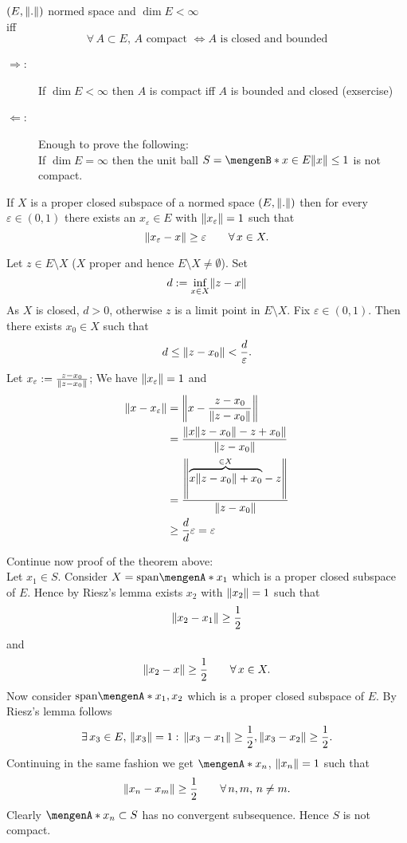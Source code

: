\begin{theorem}
	$(E,\norm{.})$ normed space and $\dim E < \infty$ \\ iff \[
		\forall\, A \subset E,\,A \text{ compact } \Leftrightarrow A \text{ is closed and bounded}
	\]
\end{theorem}
\begin{beweis}
	\begin{description}
		\item[$\Rightarrow$:]If $\dim E < \infty$ then $A$ is compact iff $A$ is bounded and closed (exsercise)
		\item[$\Leftarrow$:]Enough to prove the following: \\
		If $\dim E = \infty$ then the unit ball $S = \set[x \in E]{\norm{x}\leq 1}$ is not compact.
	\end{description}
\begin{lemma}
	If $X$ is a proper closed subspace of a normed space $(E,\norm{.})$ then for every $\varepsilon \in (0,1)$ there exists an $x_{\varepsilon} \in E$ with $\norm{x_\varepsilon}=1$ such that
	\[
		\norm{x_{\varepsilon}-x} \geq \varepsilon \qquad \forall\, x \in X.
	\]
\end{lemma}
\begin{beweis}
	Let $z \in E \setminus X$ ($X$ proper and hence $E \setminus X \neq \emptyset$). Set 
	\[
		d:= \inf_{x \in X}\norm{z-x}
	\] As $X$ is closed, $d >0$, otherwise $z$ is a limit point in $E \setminus X$. Fix $\varepsilon \in (0,1)$. Then there exists $x_0 \in X$ such that
	\[
		d \leq \norm{z-x_0} < \frac{d}{\varepsilon}.
	\]
	Let $x_\varepsilon := \frac{z-x_0}{\norm{z-x_0}}$; We have $\norm{x_\varepsilon}=1$ and
	\begin{align*}
		\norm{x- x_\varepsilon} &= \norm{x - \frac{z-x_0}{\norm{z-x_0}}} \\
		&= \frac{\norm{x \norm{z-x_0}-z + x_0}}{\norm{z-x_0}} \\
		&= \frac{\norm{\overset{\in X}{\overbrace{x \norm{z-x_0}+ x_0 }}- z}}{\norm{z-x_0}} \\
		&\geq \frac{d}{d}\varepsilon = \varepsilon
	\end{align*}
\end{beweis}
Continue now proof of the theorem above: \\
Let $x_1 \in S$. Consider $X = \text{span} \set{x_1}$ which is a proper closed subspace of $E$. Hence by Riesz's lemma exists $x_2$ with $\norm{x_2}=1$ such that
\[
	\norm{x_2-x_1} \geq \frac{1}{2} 
\]
and
\[
	\norm{x_2-x} \geq \frac{1}{2} \qquad \forall\, x \in X.
\]
Now consider $\text{span} \set{x_1,x_2}$ which is a proper closed subspace of $E$. By Riesz's lemma follows
\[
	\exists\,x_3 \in E,\, \norm{x_3}=1: \, \norm{x_3-x_1}\geq \frac{1}{2}, \norm{x_3-x_2} \geq \frac{1}{2}.
\]
Continuing in the same fashion we get $\set{x_n}$, $\norm{x_n}=1$ such that 
\[
	\norm{x_n-x_m} \geq \frac{1}{2} \qquad \forall\, n,m,\,n \neq m.
\]
Clearly $\set{x_n} \subset S$ has no convergent subsequence. Hence $S$ is not compact.
\end{beweis}
